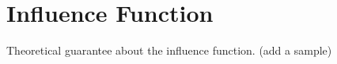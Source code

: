 \section{Influence Function} 
\label{sec:influence}

Theoretical guarantee about the influence function. (add a sample) 





